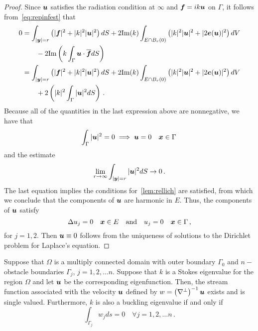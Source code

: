 \begin{proof}
Since ${\boldsymbol u}$ satisfies the radiation condition at $\infty$ and ${\boldsymbol f} = ik {\boldsymbol u}$
on $\Gamma$, it follows from~\cref{eq:repinfest} that
\begin{align}
0 &=
\int_{|{\boldsymbol y}|=r} \left( |{\boldsymbol f}|^2 + |k|^2 |{\boldsymbol u}|^2 \right) dS +
2 \text{Im}(k) \int_{E \cap B_{r}(0)} \left(|k|^2 |{\boldsymbol u}|^2 + |2{\boldsymbol e}({\boldsymbol u})|^2 \right)
dV \nonumber \\
& \qquad - 2 \text{Im} \left( k \int_{\Gamma} {\boldsymbol u} \cdot \overline{{\boldsymbol f}} dS  \right) \\
&= 
\int_{|{\boldsymbol y}|=r} \left( |{\boldsymbol f}|^2 + |k|^2 |{\boldsymbol u}|^2 \right) dS +
2 \text{Im}(k) \int_{E \cap B_{r}(0)} \left(|k|^2 |{\boldsymbol u}|^2 + |2{\boldsymbol e}({\boldsymbol u})|^2 \right)
dV \nonumber \\
& \qquad + 2 \left( |k|^{2} \int_{\Gamma} |{\boldsymbol u}|^{2} dS  \right)
\, .
\end{align}
Because all of the quantities in the last expression above are
nonnegative, we have that
\begin{equation}
\int_{\Gamma} |{\boldsymbol u}|^{2} = 0 \implies {\boldsymbol u} = 0  \quad {\boldsymbol x} \in \Gamma \, 
\end{equation}
and the estimate
\begin{equation}
\lim_{r\to\infty} \int_{|{\boldsymbol y}|=r} |{\boldsymbol u}|^{2} dS \to 0 \, .
\end{equation}
The last equation implies the conditions for~\cref{lem:rellich}
are satisfied, from which we conclude that the components
of ${\boldsymbol u}$ are harmonic in $E$. 
Thus, the components of ${\boldsymbol u}$ satisfy
\begin{equation}
\Delta u_{j}=  0 \quad {\boldsymbol x} \in E \quad \text{and} \quad
u_{j} = 0 \quad {\boldsymbol x} \in \Gamma \, ,
\end{equation}
for $j=1,2$.
Then ${\boldsymbol u} \equiv 0$ follows from the uniqueness of solutions to the 
Dirichlet problem for Laplace's equation.
\end{proof}

\begin{lem}
Suppose that $\Omega$ is a multiply connected domain with outer boundary
$\Gamma_{0}$ and $n-$ obstacle boundaries $\Gamma_{j}$, $j=1,2,\ldots n$. 
Suppose that $k$ is a Stokes eigenvalue for the region $\Omega$ and 
let ${\boldsymbol u}$ be the corresponding eigenfunction. 
Then, the stream function associated with the velocity ${\boldsymbol u}$ defined by
$w = \left(\nabla^{\perp} \right)^{-1} {\boldsymbol u}$ exists and is single valued. 
Furthermore, $k$ is also a buckling eigenvalue if and only if
\begin{equation}
\int_{\Gamma_{j}} w_{j} ds = 0 \quad \forall j=1,2,\ldots n \, .
\end{equation}
\end{lem}

